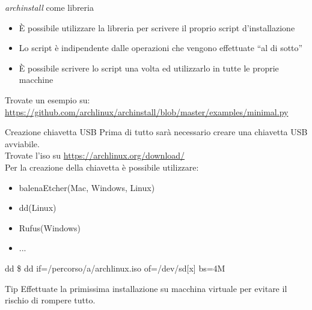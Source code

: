 \begin{frame}{\textit{archinstall} come libreria}
    \begin{itemize}
        \item È possibile utilizzare la libreria per scrivere il proprio script d'installazione
        \item Lo script è indipendente dalle operazioni che vengono effettuate ``al di sotto''
        \item È possibile scrivere lo script una volta ed utilizzarlo in tutte le proprie macchine
    \end{itemize}

    Trovate un esempio su:
    \url{https://github.com/archlinux/archinstall/blob/master/examples/minimal.py}
\end{frame}

\begin{frame}{Creazione chiavetta USB}
    Prima di tutto sarà necessario creare una chiavetta USB avviabile.\\Trovate l'iso su \url{https://archlinux.org/download/}\\
    Per la creazione della chiavetta è possibile utilizzare:
    \begin{itemize}
        \item balenaEtcher(Mac, Windows, Linux)
        \item dd(Linux)
        \item Rufus(Windows)
        \item ...
    \end{itemize}

    \begin{block}{dd}
        \$ dd if=/percorso/a/archlinux.iso of=/dev/sd[x] bs=4M\\
    \end{block}
    \begin{alertblock}{Tip}
        Effettuate la primissima installazione su macchina virtuale per evitare il rischio di rompere tutto.
    \end{alertblock}
\end{frame}


